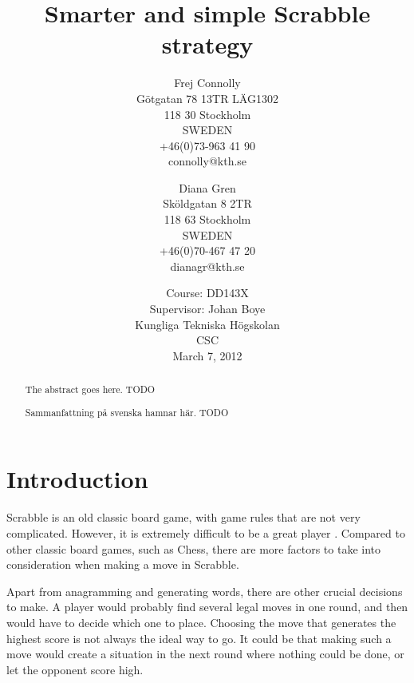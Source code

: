 \documentclass[a4paper, 12pt]{report}
\begin{document}
\graphicspath{{./images/}}
\title{Smarter and simple Scrabble strategy}
\date{Course: DD143X \\ Supervisor: Johan Boye \\ Kungliga Tekniska Högskolan \\ CSC \\ March 7, 2012}
\author{Frej Connolly \\ Götgatan 78 13TR LÄG1302 \\ 118 30 Stockholm \\ SWEDEN \\ +46(0)73-963 41 90 \\ connolly@kth.se \\
        \and Diana Gren \\ Sköldgatan 8 2TR \\ 118 63 Stockholm \\ SWEDEN \\ +46(0)70-467 47 20 \\ dianagr@kth.se}

\maketitle
\begin{abstract}
The abstract goes here. TODO
\end{abstract}

\begin{abstract}
Sammanfattning på svenska hamnar här. TODO
\end{abstract}
\tableofcontents





\chapter{Introduction}
Scrabble is an old classic board game, with game rules that are not very complicated. However, it is extremely difficult to be a great player \cite{perfectgame}. Compared to other classic board games, such as Chess, there are more factors to take into consideration when making a move in Scrabble. 

Apart from anagramming and generating words, there are other crucial decisions to make. A player would probably find several legal moves in one round, and then would have to decide which one to place. Choosing the move that generates the highest score is not always the ideal way to go. It could be that making such a move would create a situation in the next round where nothing could be done, or let the opponent score high.
\end{document}
